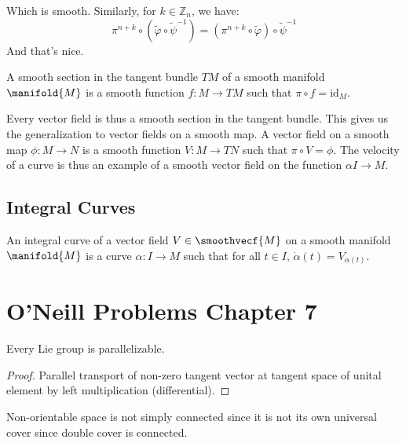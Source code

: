 \documentclass{article}                                                        %
\begin{document}
            Which is smooth. Similarly, for $k\in\mathbb{Z}_{n}$, we have:
            \begin{equation}
                \pi^{n+k}\circ(\tilde{\varphi}\circ\tilde{\psi}^{\minus{1}})
                =(\pi^{n+k}\circ\tilde{\varphi})\circ\tilde{\psi}^{\minus{1}}
            \end{equation}
            And that's nice.
            \begin{definition}
                A smooth section in the tangent bundle $TM$ of a smooth manifold
                $\manifold{M}$ is a smooth function $f:M\rightarrow{TM}$ such
                that $\pi\circ{f}=\textrm{id}_{M}$.
            \end{definition}
            Every vector field is thus a smooth section in the tangent bundle.
            This gives us the generalization to vector fields on a smooth map.
            A vector field on a smooth map $\phi:M\rightarrow{N}$ is a smooth
            function $V:M\rightarrow{TN}$ such that $\pi\circ{V}=\phi$. The
            velocity of a curve is thus an example of a smooth vector field on
            the function $\alpha{I}\rightarrow{M}$.
        \subsection{Integral Curves}
            \begin{definition}
                An integral curve of a vector field $V\in\smoothvecf{M}$ on a
                smooth manifold $\manifold{M}$ is a curve
                $\alpha:I\rightarrow{M}$ such that for all $t\in{I}$,
                $\dot{\alpha}(t)=V_{\alpha(t)}$.
            \end{definition}
    \section{O'Neill Problems Chapter 7}
            \begin{theorem}
                Every Lie group is parallelizable.
            \end{theorem}
            \begin{proof}
                Parallel transport of non-zero tangent vector at tangent space
                of unital element by left multiplication (differential).
            \end{proof}
            Non-orientable space is not simply connected since it is not its own
            universal cover since double cover is connected.
\end{document}

